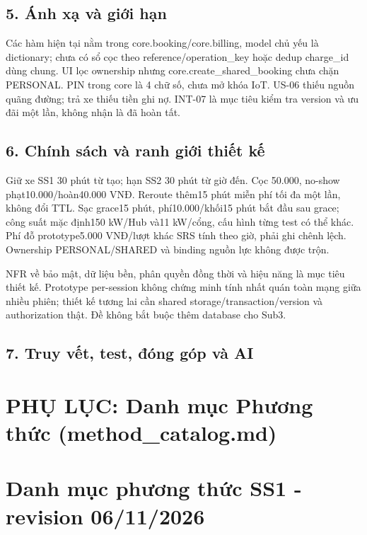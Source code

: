 \documentclass[11pt,a4paper]{article}
\begin{document}
\hypertarget{uxe1nh-xux1ea1-vuxe0-giux1edbi-hux1ea1n}{%
\subsection{5. Ánh xạ và giới
hạn}\label{uxe1nh-xux1ea1-vuxe0-giux1edbi-hux1ea1n}}

Các hàm hiện tại nằm trong core.booking/core.billing, model chủ yếu là
dictionary; chưa có sổ cọc theo reference/operation\_key hoặc dedup
charge\_id dùng chung. UI lọc ownership nhưng
core.create\_shared\_booking chưa chặn PERSONAL. PIN trong core là 4 chữ
số, chưa mở khóa IoT. US-06 thiếu nguồn quãng đường; trả xe thiếu tiền
ghi nợ. INT-07 là mục tiêu kiểm tra version và ưu đãi một lần, không
nhận là đã hoàn tất.

\hypertarget{chuxednh-suxe1ch-vuxe0-ranh-giux1edbi-thiux1ebft-kux1ebf}{%
\subsection{6. Chính sách và ranh giới thiết
kế}\label{chuxednh-suxe1ch-vuxe0-ranh-giux1edbi-thiux1ebft-kux1ebf}}

Giữ xe SS1 30 phút từ tạo; hạn SS2 30 phút từ giờ đến. Cọc 50.000,
no-show phạt10.000/hoàn40.000 VNĐ. Reroute thêm15 phút miễn phí tối đa
một lần, không đổi TTL. Sạc grace15 phút, phí10.000/khối15 phút bắt đầu
sau grace; công suất mặc định150 kW/Hub và11 kW/cổng, cấu hình từng test
có thể khác. Phí đỗ prototype5.000 VNĐ/lượt khác SRS tính theo giờ, phải
ghi chênh lệch. Ownership PERSONAL/SHARED và binding nguồn lực không
được trộn.

NFR về bảo mật, dữ liệu bền, phân quyền đồng thời và hiệu năng là mục
tiêu thiết kế. Prototype per-session không chứng minh tính nhất quán
toàn mạng giữa nhiều phiên; thiết kế tương lai cần shared
storage/transaction/version và authorization thật. Đề không bắt buộc
thêm database cho Sub3.

\hypertarget{truy-vux1ebft-test-ux111uxf3ng-guxf3p-vuxe0-ai}{%
\subsection{7. Truy vết, test, đóng góp và
AI}\label{truy-vux1ebft-test-ux111uxf3ng-guxf3p-vuxe0-ai}}

\newpage
\section*{PHỤ LỤC: Danh mục Phương thức (method\_catalog.md)}
\hypertarget{danh-mux1ee5c-phux1b0ux1a1ng-thux1ee9c-ss1---revision-06112026}{%
\section{Danh mục phương thức SS1 - revision
06/11/2026}\label{danh-mux1ee5c-phux1b0ux1a1ng-thux1ee9c-ss1---revision-06112026}}
\end{document}
